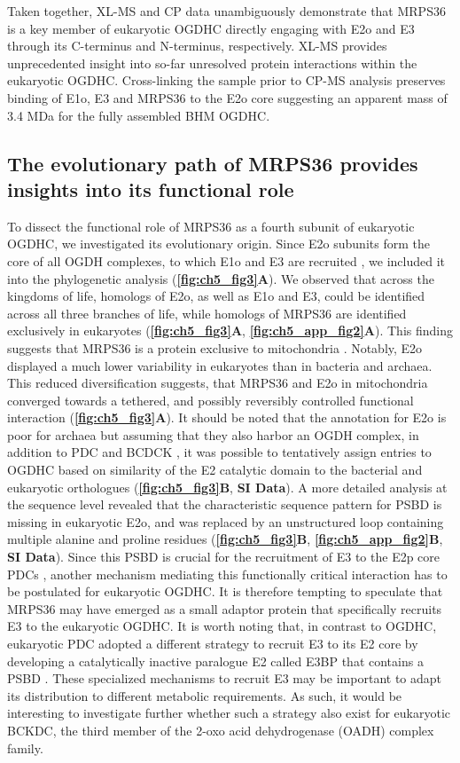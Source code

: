 Taken together, XL-MS and CP data unambiguously demonstrate that MRPS36 is a key member of eukaryotic OGDHC directly engaging with E2o and E3 through its C-terminus and N-terminus, respectively. XL-MS provides unprecedented insight into so-far unresolved protein interactions within the eukaryotic OGDHC. Cross-linking the sample prior to CP-MS analysis preserves binding of E1o, E3 and MRPS36 to the E2o core suggesting an apparent mass of 3.4 MDa for the fully assembled BHM OGDHC.
%
\subsection*{The evolutionary path of MRPS36 provides insights into its functional role}
To dissect the functional role of MRPS36 as a fourth subunit of eukaryotic OGDHC, we investigated its evolutionary origin. Since E2o subunits form the core of all OGDH complexes, to which E1o and E3 are recruited \cite{Nemeria_2021}, we included it into the phylogenetic analysis (\textbf{\autoref{fig:ch5_fig3}A}). We observed that across the kingdoms of life, homologs of E2o, as well as E1o and E3, could be identified across all three branches of life, while homologs of MRPS36 are identified exclusively in eukaryotes (\textbf{\autoref{fig:ch5_fig3}A}, \textbf{\autoref{fig:ch5_app_fig2}A}). This finding suggests that MRPS36 is a protein exclusive to mitochondria \cite{Gray_2015}. Notably, E2o displayed a much lower variability in eukaryotes than in bacteria and archaea. This reduced diversification suggests, that MRPS36 and E2o in mitochondria converged towards a tethered, and possibly reversibly controlled functional interaction (\textbf{\autoref{fig:ch5_fig3}A}). It should be noted that the annotation for E2o is poor for archaea but assuming that they also harbor an OGDH complex, in addition to PDC and BCDCK \cite{Heath_2007}, it was possible to tentatively assign entries to OGDHC based on similarity of the E2 catalytic domain to the bacterial and eukaryotic orthologues (\textbf{\autoref{fig:ch5_fig3}B}, \textbf{SI Data}). A more detailed analysis at the sequence level revealed that the characteristic sequence pattern for PSBD is missing in eukaryotic E2o, and was replaced by an unstructured loop containing multiple alanine and proline residues (\textbf{\autoref{fig:ch5_fig3}B}, \textbf{\autoref{fig:ch5_app_fig2}B}, \textbf{SI Data}). Since this PSBD is crucial for the recruitment of E3 to the E2p core PDCs \cite{Allen_2005, Chandrasekhar_2013, Ciszak_2006, Mande_1996}, another mechanism mediating this functionally critical interaction has to be postulated for eukaryotic OGDHC. It is therefore tempting to speculate that MRPS36 may have emerged as a small adaptor protein that specifically recruits E3 to the eukaryotic OGDHC. It is worth noting that, in contrast to OGDHC, eukaryotic PDC adopted a different strategy to recruit E3 to its E2 core by developing a catalytically inactive paralogue E2 called E3BP that contains a PSBD \cite{Behal_1994, Smolle_2006}. These specialized mechanisms to recruit E3 may be important to adapt its distribution to different metabolic requirements. As such, it would be interesting to investigate further whether such a strategy also exist for eukaryotic BCKDC, the third member of the 2-oxo acid dehydrogenase (OADH) complex family.

